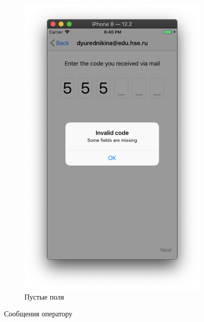 \documentclass[a4paper,12pt]{article}
\begin{document}
\begin{figure}[h!]
\begin{subfigure}[b]{0.3\linewidth}
			\includegraphics[width=\linewidth]{../includes/ro/wrongcode2.png}
			\caption{\label{pic: wrong_code} Пустые поля}
		\end{subfigure}
		
		\caption{\label{pic: wr} Сообщения оператору}
	\end{figure}
	
	
	\newpage
	\listRegistration
\end{document}
